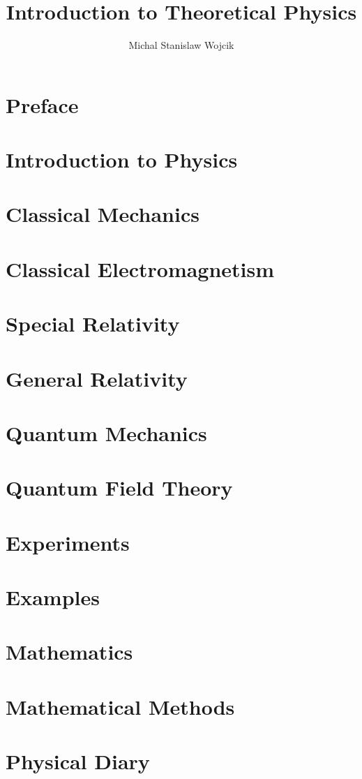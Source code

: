 \documentclass[a4paper,12pt]{book}
\title{Introduction to Theoretical Physics}
\author{Michal Stanislaw Wojcik}
\numberwithin{equation}{subsection}
\begin{document}
\maketitle
\newpage \vspace*{16cm}
\thispagestyle{empty}
\tableofcontents
\chapter*{Preface}

\chapter{Introduction to Physics}

\chapter{Classical Mechanics}

\chapter{Classical Electromagnetism}

\chapter{Special Relativity}

\chapter{General Relativity}

\chapter{Quantum Mechanics}

\chapter{Quantum Field Theory}

\chapter{Experiments}

\chapter{Examples}

%
\chapter{Mathematics}

\chapter{Mathematical Methods}

\chapter{Physical Diary}

%


\end{document}

